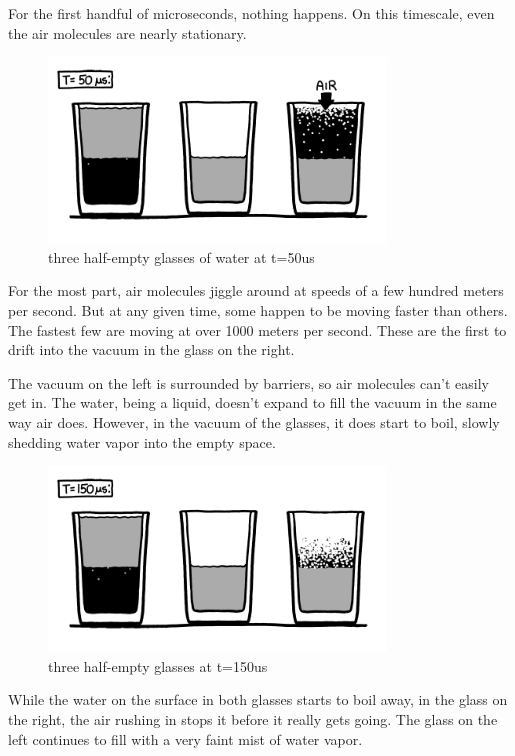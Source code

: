 {For the first handful of microseconds, nothing happens. On this timescale, even the air molecules are nearly stationary.}

\begin{figure}[!htbp]
\centering
\includegraphics[scale=0.5, max width=0.8\textwidth]{imgs/a/6/glass_50ns.png}
\caption{three half-empty glasses of water at t=50us}
\end{figure}

{For the most part, air molecules jiggle around at speeds of a few hundred meters per second. But at any given time, some happen to be moving faster than others. The fastest few are moving at over 1000 meters per second. These are the first to drift into the vacuum in the glass on the right.}

{The vacuum on the left is surrounded by barriers, so air molecules can’t easily get in. The water, being a liquid, doesn’t expand to fill the vacuum in the same way air does. However, in the vacuum of the glasses, it does start to boil, slowly shedding water vapor into the empty space.}

\begin{figure}[!htbp]
\centering
\includegraphics[scale=0.5, max width=0.8\textwidth]{imgs/a/6/glass_150ns.png}
\caption{three half-empty glasses at t=150us}
\end{figure}

{While the water on the surface in both glasses starts to boil away, in the glass on the right, the air rushing in stops it before it really gets going. The glass on the left continues to fill with a very faint mist of water vapor.}

